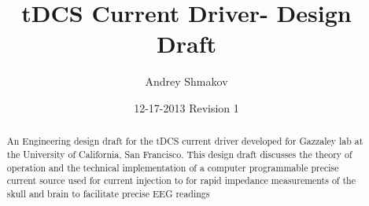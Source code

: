 \documentclass[reprint]{revtex4-1}
\begin{document}
\title{tDCS Current Driver- Design Draft}
\date{12-17-2013 Revision 1}
\author{Andrey Shmakov }



\begin{abstract}
An Engineering design draft for the tDCS current driver developed for Gazzaley lab at the University of California, San Francisco. This design draft discusses the theory of operation and the technical implementation of a computer programmable precise current source used for current injection to for rapid impedance measurements of the skull and brain to facilitate precise EEG readings
\end{abstract}
\maketitle





\end{document}
